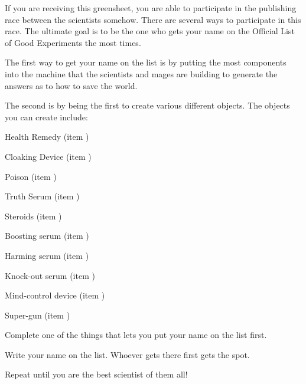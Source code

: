 \documentclass[green]{guildcamp3}
\begin{document}
	
	\name{\gSPublishing{}}
	
	
	
	If you are receiving this greensheet, you are able to participate in the publishing race between the scientists somehow. There are several ways to participate in this race. The ultimate goal is to be the one who gets your name on the Official List of Good Experiments the most times. 
	
	The first way to get your name on the list is by putting the most components into the machine that the scientists and mages are building to generate the answers as to how to save the world.
	
	The second is by being the first to create various different objects. The objects you can create include:

	Health Remedy (item \iHealthRemedy{\MYnumber})
	
	Cloaking Device (item \iCloakingDevice{\MYnumber})
	
	Poison (item \iTechPoison{\MYnumber})
	
	Truth Serum (item \iTruthSerum{\MYnumber})
	
	Steroids (item \iSteroids{\MYnumber})
	
	Boosting serum (item \iCRUpSerum{\MYnumber})
	
	Harming serum (item \iCRDownSerum{\MYnumber})
	
	Knock-out serum (item \iSonicKO{\MYnumber})
	
	Mind-control device (item \iMCDevice{\MYnumber})
	
	Super-gun (item \iUpgradedTechGun{})

	
	\begin{enum}[Directions]
		\item Complete one of the things that lets you put your name on the list first.
		\item Write your name on the list. Whoever gets there first gets the spot. 
		\item Repeat until you are the best scientist of them all!
	\end{enum}
	
	
\end{document}
